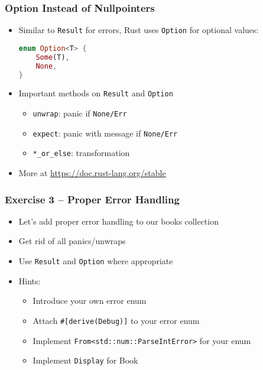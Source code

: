 \begin{frame}[fragile]
    \frametitle{Option Instead of Nullpointers}

    \begin{itemize}
        \item Similar to \texttt{Result} for errors, Rust uses \texttt{Option} for optional values:
        \begin{lstlisting}[language=rust]
enum Option<T> {
    Some(T),
    None,
}
        \end{lstlisting}

    \pause

        \item Important methods on \texttt{Result} and \texttt{Option}
        \begin{itemize}
            \item \texttt{unwrap}: panic if \texttt{None/Err}
            \item \texttt{expect}: panic with message if \texttt{None/Err}
            \item \texttt{*\_or\_else}: transformation
        \end{itemize}

    \pause

        \item More at \url{https://doc.rust-lang.org/stable}
    \end{itemize}
\end{frame}

\begin{frame}[fragile]
    \frametitle{Exercise 3 -- Proper Error Handling}

    \begin{itemize}
        \item Let's add proper error handling to our books collection
        \item Get rid of all panics/unwraps
        \item Use \texttt{Result} and \texttt{Option} where appropriate
        \item Hints:
        \begin{itemize}
            \item Introduce your own error enum
            \item Attach \texttt{\#[derive(Debug)]} to your error enum
            \item Implement \texttt{From<std::num::ParseIntError>} for your enum
            \item Implement \texttt{Display} for Book
        \end{itemize}
    \end{itemize}
\end{frame}
